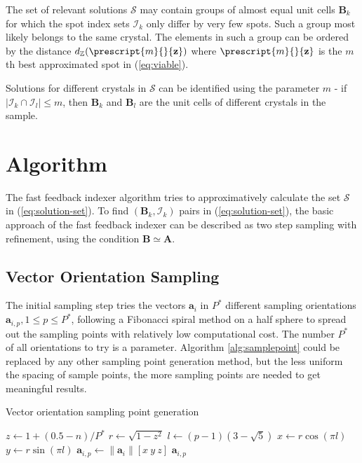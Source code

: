 \documentclass[a4paper,10pt]{article}
\newcommand{\vect}[1]{\mathbf{#1}}
\newcommand{\mat}[1]{\mathbf{#1}}
\newcommand{\distZ}[1]{d_\mathbb{Z}(#1)}
\begin{document}
The set of relevant solutions $\mathcal{S}$ may contain groups of almost equal unit cells $\mat{B}_k$ for which the spot index sets $\mathcal{I}_k$ only differ by very few spots. Such a group most likely belongs to the same crystal. The elements in such a group can be ordered by the distance $\distZ{\prescript{m}{}{\vect{z}}}$ where $\prescript{m}{}{\vect{z}}$ is the $m$th best approximated spot in (\ref{eq:viable}).

Solutions for different crystals in $\mathcal{S}$ can be identified using the parameter $m$ - if $|\mathcal{I}_k \cap \mathcal{I}_l | \leq m$, then $\mat{B}_k$ and $\mat{B}_l$ are the unit cells of different crystals in the sample.

\section{Algorithm}

The fast feedback indexer algorithm tries to approximatively calculate the set $\mathcal{S}$ in (\ref{eq:solution-set}). To find $(\mat{B}_k,\mathcal{I}_k)$ pairs in (\ref{eq:solution-set}), the basic approach of the fast feedback indexer can be described as two step sampling with refinement, using the condition $\mat{B} \simeq \mat{A}$.

\subsection{Vector Orientation Sampling}
The initial sampling step tries the vectors $\vect{a}_i$ in $P^*$ different sampling orientations $\vect{a}_{i,p}, 1\leq p\leq P^*$, following a Fibonacci spiral method \cite{gonzales} on a half sphere to spread out the sampling points with relatively low computational cost. The number $P^*$ of all orientations to try is a parameter. Algorithm \ref{alg:samplepoint} could be replaced by any other sampling point generation method, but the less uniform the spacing of sample points, the more sampling points are needed to get meaningful results.

\begin{algorithm}
\caption{Vector orientation sampling point generation}
\label{alg:samplepoint}
\begin{algorithmic}[1]
\Function{sample-point}{$\vect{a}_i,p,P^*$}
\State $z\gets 1 + (0.5 - n)/P^*$
\State $r\gets \sqrt{1 - z^2}$
\State $l\gets (p - 1)(3 - \sqrt{5})$
\State $x\gets r \cos(\pi l)$
\State $y\gets r \sin(\pi l)$
\State $\vect{a}_{i,p}\gets \|\vect{a}_i\| [x\ y\ z]$
\State \Return $\vect{a}_{i,p}$
\EndFunction
\end{algorithmic}
\end{algorithm}
\end{document}
